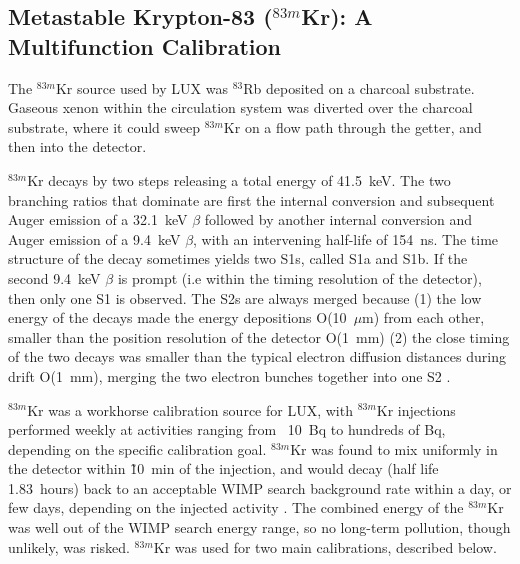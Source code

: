 \subsection{Metastable Krypton-83 ($^{83m}$Kr): A Multifunction Calibration}
\label{sec:krypton}
The $^{83m}$Kr source used by \ac{LUX} was $^{83}$Rb deposited on a charcoal substrate. Gaseous xenon within the circulation system was diverted over the charcoal substrate, where it could sweep $^{83m}$Kr on a flow path through the getter, and then into the detector. 

$^{83m}$Kr decays by two steps releasing a total energy of 41.5~keV. The two branching ratios that dominate are first the internal conversion and subsequent Auger emission of a 32.1~keV $\beta$ followed by another internal conversion and Auger emission of a 9.4~keV $\beta$, with an intervening half-life of 154~ns. The time structure of the decay sometimes yields two S1s, called S1a and S1b. If the second 9.4~keV $\beta$ is prompt (i.e within the timing resolution of the detector), then only one S1 is observed. The S2s are always merged because (1) the low energy of the decays made the energy depositions O(10~$\mu$m) from each other, smaller than the position resolution of the detector O(1~mm) (2) the close timing of the two decays was smaller than the typical electron diffusion distances during drift O(1~mm), merging the two electron bunches together into one S2 \cite{LUXKr}.

$^{83m}$Kr was a workhorse calibration source for \ac{LUX}, with $^{83m}$Kr injections performed weekly at activities ranging from ~10~Bq to hundreds of Bq, depending on the specific calibration goal. $^{83m}$Kr was found to mix uniformly in the detector within \~10~min of the injection, and would decay (half life 1.83~hours) back to an acceptable \ac{WIMP} search background rate within a day, or few days, depending on the injected activity \cite{LUXKr}. The combined energy of the $^{83m}$Kr was well out of the \ac{WIMP} search energy range, so no long-term pollution, though unlikely, was risked. $^{83m}$Kr was used for two main calibrations, described below.

